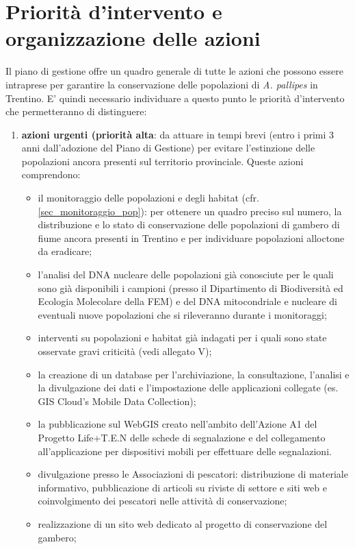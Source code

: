 \documentclass[11pt,a4paper,italian,twoside,openany]{memoir}
\newcommand\BackgroundPicTwo{
  \put(0,0){
    \parbox[b][\paperheight]{\paperwidth}{%
      \vfill
      \centering
      \texttt{[image: 2.pdf]}
      \vfill
    }
  }
}
\newcommand\DeactivateBG{\backgroundsetup{contents={}}}
\begin{document}
\chapter{Priorità d'intervento e organizzazione delle azioni}
\DeactivateBG
\AddToShipoutPicture*{\BackgroundPicTwo}
Il piano di gestione offre un quadro generale di tutte le azioni che possono essere intraprese per garantire la conservazione delle popolazioni di \emph{A. pallipes} in Trentino. E' quindi necessario individuare a questo punto le priorità d'intervento che permetteranno di distinguere:
\begin{enumerate}[label={\arabic*)}]
  \item \textbf{azioni urgenti (priorità alta}: da attuare in tempi brevi (entro i primi 3 anni dall'adozione del Piano di Gestione) per evitare l'estinzione delle popolazioni ancora presenti sul territorio provinciale. Queste azioni comprendono:
  \begin{itemize}
    \item il monitoraggio delle popolazioni e degli habitat (cfr. \ref{sec_monitoraggio_pop}): per ottenere un quadro preciso sul numero, la distribuzione e lo stato di conservazione delle popolazioni di gambero di fiume ancora presenti in Trentino e per individuare popolazioni alloctone da eradicare;
    \item l'analisi del DNA nucleare delle popolazioni già conosciute per le quali sono già disponibili i campioni (presso il Dipartimento di Biodiversità ed Ecologia Molecolare della FEM) e del DNA mitocondriale e nucleare di eventuali nuove popolazioni che si rileveranno durante i monitoraggi;
    \item interventi su popolazioni e habitat già indagati per i quali sono state osservate gravi criticità (vedi allegato V);
    \item la creazione di un database per l'archiviazione, la consultazione, l'analisi e la divulgazione dei dati e l'impostazione delle applicazioni collegate (es. GIS Cloud's Mobile Data Collection);
    \item la pubblicazione sul WebGIS creato nell'ambito dell'Azione A1 del Progetto Life+T.E.N delle schede di segnalazione e del collegamento all'applicazione per dispositivi mobili per effettuare delle segnalazioni. 
    \item divulgazione presso le Associazioni di pescatori: distribuzione di materiale informativo, pubblicazione di articoli su riviste di settore e siti web e coinvolgimento dei pescatori nelle attività di conservazione; 
    \item realizzazione di un sito web dedicato al progetto di conservazione del gambero;

\end{itemize}
\end{enumerate}
\end{document}
